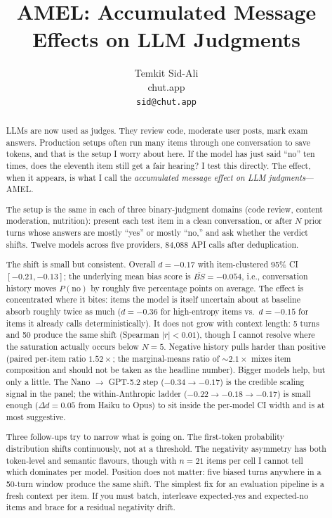 \documentclass[10pt,twocolumn]{article}
\title{AMEL: Accumulated Message Effects on LLM Judgments}
\author{
  Temkit Sid-Ali \\
  chut.app \\
  \texttt{sid@chut.app}
}
\begin{document}
\maketitle

\begin{abstract}
LLMs are now used as judges. They review code, moderate user posts, mark exam answers. Production setups often run many items through one conversation to save tokens, and that is the setup I worry about here. If the model has just said ``no'' ten times, does the eleventh item still get a fair hearing? I test this directly. The effect, when it appears, is what I call the \textit{accumulated message effect on LLM judgments}---AMEL.

The setup is the same in each of three binary-judgment domains (code review, content moderation, nutrition): present each test item in a clean conversation, or after $N$ prior turns whose answers are mostly ``yes'' or mostly ``no,'' and ask whether the verdict shifts. Twelve models across five providers, 84,088 API calls after deduplication.

The shift is small but consistent. Overall $d = -0.17$ with item-clustered 95\% CI $[-0.21, -0.13]$; the underlying mean bias score is $\bar{BS} = -0.054$, i.e., conversation history moves $P(\text{no})$ by roughly five percentage points on average. The effect is concentrated where it bites: items the model is itself uncertain about at baseline absorb roughly twice as much ($d = -0.36$ for high-entropy items vs.\ $d = -0.15$ for items it already calls deterministically). It does not grow with context length: 5 turns and 50 produce the same shift (Spearman $|r| < 0.01$), though I cannot resolve where the saturation actually occurs below $N = 5$. Negative history pulls harder than positive (paired per-item ratio $1.52\times$; the marginal-means ratio of $\sim 2.1\times$ mixes item composition and should not be taken as the headline number). Bigger models help, but only a little. The Nano $\to$ GPT-5.2 step ($-0.34 \to -0.17$) is the credible scaling signal in the panel; the within-Anthropic ladder ($-0.22 \to -0.18 \to -0.17$) is small enough ($\Delta d = 0.05$ from Haiku to Opus) to sit inside the per-model CI width and is at most suggestive.

Three follow-ups try to narrow what is going on. The first-token probability distribution shifts continuously, not at a threshold. The negativity asymmetry has both token-level and semantic flavours, though with $n = 21$ items per cell I cannot tell which dominates per model. Position does not matter: five biased turns anywhere in a 50-turn window produce the same shift. The simplest fix for an evaluation pipeline is a fresh context per item. If you must batch, interleave expected-yes and expected-no items and brace for a residual negativity drift.
\end{abstract}
\end{document}
